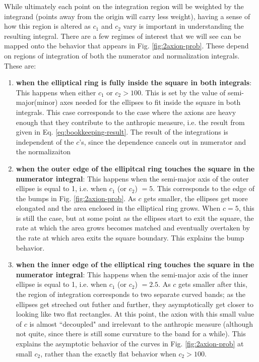 \documentclass{article}
\begin{document}
While ultimately each point on the integration region will be weighted by the integrand (points away from the origin will carry less weight), having a sense of how this region is altered as $c_1$ and $c_2$ vary is important in understanding the resulting integral. There are a few regimes of interest that we will see can be mapped onto the behavior that appears in Fig. \ref{fig:2axion-prob}. These depend on regions of integration of both the numerator and normalization integrals. These are:
\begin{enumerate}
    \item \textbf{when the elliptical ring is fully inside the square in both integrals}: This happens when either $c_1$ or $c_2 > 100$. This is set by the value of semi-major(minor) axes needed for the ellipses to fit inside the square in both integrals. This case corresponds to the case where the axions are heavy enough that they contribute to the anthropic measure, i.e. the result from \cite{exploring-string-axiverse} given in Eq. \eqref{eq:bookkeeping-result}. The result of the integrations is independent of the $c$'s, since the dependence cancels out in numerator and the normalizaiton
    \item \textbf{when the outer edge of the ellipitcal ring touches the square in the numerator integral}: This happens when the semi-major axis of the outer ellipse is equal to 1, i.e. when $c_1$ (or $c_2$) $=5$. This corresponds to the edge of the bumps in Fig. \ref{fig:2axion-prob}. As $c$ gets smaller, the ellipses get more elongated and the area enclosed in the elliptical ring grows. When $c=5$, this is still the case, but at some point as the ellipses start to exit the square, the rate at which the area grows becomes matched and eventually overtaken by the rate at which area exits the square boundary. This explains the bump behavior.
    \item \textbf{when the inner edge of the elliptical ring touches the square in the numerator integral}: This happens when the semi-major axis of the inner ellipse is equal to 1, i.e. when $c_1$ (or $c_2$) $=2.5$. As $c$ gets smaller after this, the region of integration corresponds to two separate curved bands; as the ellipses get streched out futher and further, they asymptotically get closer to looking like two flat rectangles. At this point, the axion with this small value of $c$ is almost ``decoupled" and irrelevant to the anthropic measure (although not quite, since there is still some curvature to the band for a while). This explains the asymptotic behavior of the curves in Fig. \ref{fig:2axion-prob} at small $c_2$, rather than the exactly flat behavior when $c_2>100$.
\end{enumerate}
\end{document}
